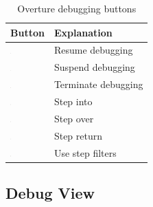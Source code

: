 \documentclass{overturerepchap}
\begin{document}
\begin{table}
\begin{center}
\caption{Overture debugging buttons\label{tab:debugButtons}}
\begin{tabular}{|l|l|}\hline \hline
\textbf{Button} & \textbf{Explanation} \\ \hline
\includegraphics[width=0.03\textwidth]{figures/resume} & Resume
debugging\index{icon!resume debugging} \\
\includegraphics[width=0.03\textwidth]{figures/suspend} & Suspend
debugging\index{icon!suspend debugging}\\
\includegraphics[width=0.03\textwidth]{figures/terminate} & Terminate
debugging\index{icon!terminate debugging}\\
\includegraphics[width=0.03\textwidth]{figures/stepinto} & Step
into\index{icon!step into}\\
\includegraphics[width=0.03\textwidth]{figures/stepover} & Step
over\index{icon!step over} \\
\includegraphics[width=0.03\textwidth]{figures/stepreturn} & Step
return\index{icon!step return}\\
\includegraphics[width=0.03\textwidth]{figures/stepbystep} & Use step
filters\index{icon!use step filters}\\
\hline \hline
\end{tabular}
\end{center}
\end{table}

\subsection{Debug View}
\end{document}
